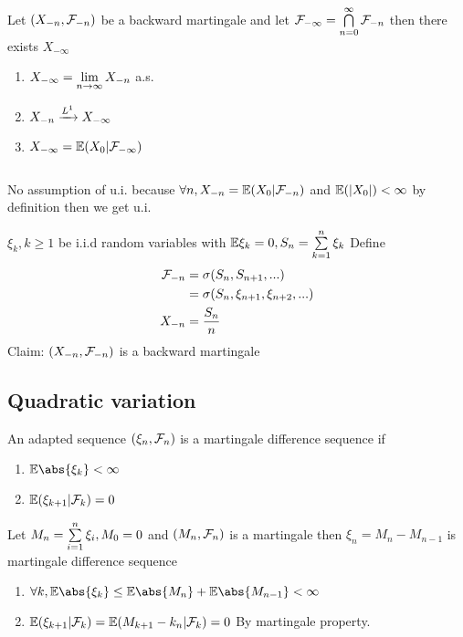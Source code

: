 \begin{thm}
\label{BMCT} Let $(X_{-n}, \mathcal{F}_{-n})$ be a backward martingale and let $\mathcal{F}_{-\infty} = \bigcap\limits_{n=0}^\infty \mathcal{F}_{-n}$ then there exists $X_{-\infty}$ \begin{enumerate}
    \item $X_{-\infty} = \lim\limits_{n\rightarrow \infty} X_{-n}$ a.s.
    \item $X_{-n} \xrightarrow{L^{1}} X_{-\infty}$
    \item $X_{-\infty} = \mathbb{E}(X_0 | \mathcal{F}_{-\infty})$
\end{enumerate}
\begin{equation*}
     \qquad 
\end{equation*}

\begin{rem}
No assumption of u.i. because $\forall n, X_{-n} = \mathbb{E}(X_0|\mathcal{F}_{-n})$ and $\mathbb{E}(|X_0|) <\infty$ by definition then we get u.i.
\end{rem}
\end{thm}
\begin{example}
$\xi_k, k \geq 1$ be i.i.d random variables with $\mathbb{E} \xi_k = 0, S_n = \sum\limits_{k=1}^n \xi_k$ Define \begin{align*}
    \mathcal{F}_{-n} &= \sigma(S_n, S_{n+1}, ...) \\
    &= \sigma(S_n, \xi_{n+1},\xi_{n+2}, ...) \\
    X_{-n} &= \frac{S_n}{n}
\end{align*}Claim: $(X_{-n}, \mathcal{F}_{-n})$ is a backward martingale
\end{example}

\newpage
\subsection{Quadratic variation}
\begin{dfn}
An adapted sequence $(\xi_n ,\mathcal{F}_n)$ is a martingale difference sequence if \begin{enumerate}
    \item $ \E\abs{\xi_k} < \infty$
    \item $\mathbb{E}(\xi_{k+1}|\mathcal{F}_k) = 0$
\end{enumerate}
\end{dfn}
\begin{example}
Let $M_n =\sum\limits_{i=1}^n \xi_i, M_0 = 0$ and $(M_n, \mathcal{F}_n)$ is a martingale then $\xi_n = M_n - M_{n-1}$ is martingale difference sequence
\begin{enumerate}
    \item $\forall k, \E\abs{\xi_k} \leq \E\abs{M_n} +\E\abs{M_{n-1}} <\infty$
    \item $\mathbb{E}(\xi_{k+1}|\mathcal{F}_k) = \mathbb{E}(M_{k+1} - k_n|\mathcal{F}_k) = 0$ By martingale property.
\end{enumerate}
\end{example}
\vspace{2cm}

